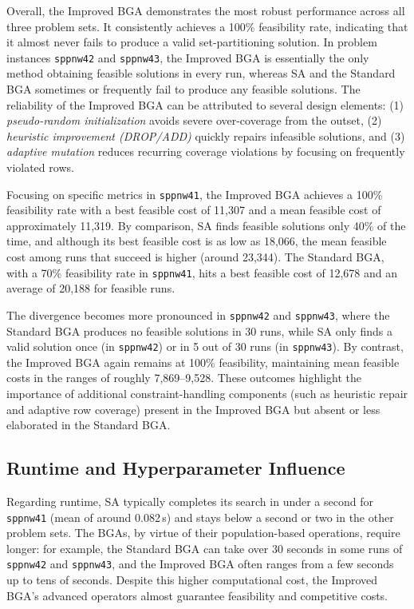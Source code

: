 \documentclass[12pt]{article}
\begin{document}
Overall, the Improved BGA demonstrates the most robust performance across all three problem sets. It consistently achieves a 100\% feasibility rate, indicating that it almost never fails to produce a valid set-partitioning solution. In problem instances \texttt{sppnw42} and \texttt{sppnw43}, the Improved BGA is essentially the only method obtaining feasible solutions in every run, whereas SA and the Standard BGA sometimes or frequently fail to produce any feasible solutions. The reliability of the Improved BGA can be attributed to several design elements: (1) \emph{pseudo-random initialization} avoids severe over-coverage from the outset, (2) \emph{heuristic improvement (DROP/ADD)} quickly repairs infeasible solutions, and (3) \emph{adaptive mutation} reduces recurring coverage violations by focusing on frequently violated rows.

Focusing on specific metrics in \texttt{sppnw41}, the Improved BGA achieves a 100\% feasibility rate with a best feasible cost of 11,307 and a mean feasible cost of approximately 11,319. By comparison, SA finds feasible solutions only 40\% of the time, and although its best feasible cost is as low as 18,066, the mean feasible cost among runs that succeed is higher (around 23,344). The Standard BGA, with a 70\% feasibility rate in \texttt{sppnw41}, hits a best feasible cost of 12,678 and an average of 20,188 for feasible runs.

The divergence becomes more pronounced in \texttt{sppnw42} and \texttt{sppnw43}, where the Standard BGA produces no feasible solutions in 30 runs, while SA only finds a valid solution once (in \texttt{sppnw42}) or in 5 out of 30 runs (in \texttt{sppnw43}). By contrast, the Improved BGA again remains at 100\% feasibility, maintaining mean feasible costs in the ranges of roughly 7,869–9,528. These outcomes highlight the importance of additional constraint-handling components (such as heuristic repair and adaptive row coverage) present in the Improved BGA but absent or less elaborated in the Standard BGA.

\subsection{Runtime and Hyperparameter Influence}

Regarding runtime, SA typically completes its search in under a second for \texttt{sppnw41} (mean of around 0.082\,s) and stays below a second or two in the other problem sets. The BGAs, by virtue of their population-based operations, require longer: for example, the Standard BGA can take over 30 seconds in some runs of \texttt{sppnw42} and \texttt{sppnw43}, and the Improved BGA often ranges from a few seconds up to tens of seconds. Despite this higher computational cost, the Improved BGA’s advanced operators almost guarantee feasibility and competitive costs.
\end{document}

